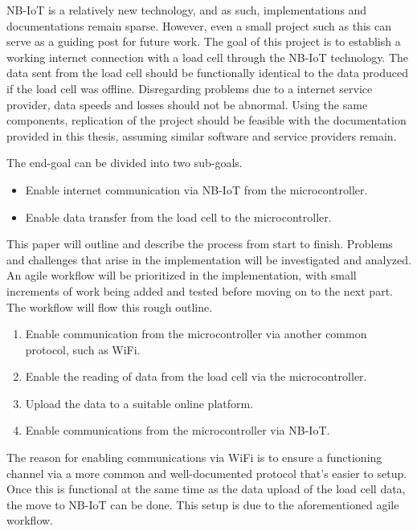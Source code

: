 NB-IoT is a relatively new technology, and as such, implementations and documentations remain sparse.\cite{NB-overview} However, even a small project such as this can serve as a guiding post for future work. The goal of this project is to establish a working internet connection with a load cell through the NB-IoT technology. The data sent from the load cell should be functionally identical to the data produced if the load cell was offline. Disregarding problems due to a internet service provider, data speeds and losses should not be abnormal. Using the same components, replication of the project should be feasible with the documentation provided in this thesis, assuming similar software and service providers remain. 

The end-goal can be divided into two sub-goals. 
\begin{itemize}
	\item Enable internet communication via NB-IoT from the microcontroller.
	\item Enable data transfer from the load cell to the microcontroller.
\end{itemize}

This paper will outline and describe the process from start to finish. Problems and challenges that arise in the implementation will be investigated and analyzed. An agile workflow will be prioritized in the implementation, with small increments of work being added and tested before moving on to the next part. The workflow will flow this rough outline.
\begin{enumerate}
	\item Enable communication from the microcontroller via another common protocol, such as WiFi. %
	\item Enable the reading of data from the load cell via the microcontroller.
	\item Upload the data to a suitable online platform.
	\item Enable communications from the microcontroller via NB-IoT.
\end{enumerate}
The reason for enabling communications via WiFi is to ensure a functioning channel via a more common and well-documented protocol that's easier to setup. Once this is functional at the same time as the data upload of the load cell data, the move to NB-IoT can be done. This setup is due to the aforementioned agile workflow.
	

